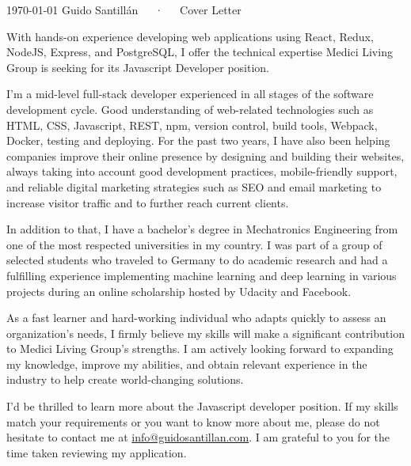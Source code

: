 \documentclass[11pt, a4paper]{awesome-cv}
\begin{document}
\makecvheader[C]

\makecvfooter
  {\today}
  {Guido Santillán~~~·~~~Cover Letter}
  {}

\makelettertitle

\begin{cvletter}

With hands-on experience developing web applications using React, Redux, NodeJS, Express, and PostgreSQL, I offer the technical expertise Medici Living Group is seeking for its Javascript Developer position.

I'm a mid-level full-stack developer experienced in all stages of the software development cycle. Good understanding of web-related technologies such as HTML, CSS, Javascript, REST, npm, version control, build tools, Webpack, Docker, testing and deploying. For the past two years, I have also been helping companies improve their online presence by designing and building their websites, always taking into account good development practices, mobile-friendly support, and reliable digital marketing strategies such as SEO and email marketing to increase visitor traffic and to further reach current clients.

In addition to that, I have a bachelor's degree in Mechatronics Engineering from one of the most respected universities in my country. I was part of a group of selected students who traveled to Germany to do academic research and had a fulfilling experience implementing machine learning and deep learning in various projects during an online scholarship hosted by Udacity and Facebook.

As a fast learner and hard-working individual who adapts quickly to assess an organization's needs, I firmly believe my skills will make a significant contribution to Medici Living Group's strengths. I am actively looking forward to expanding my knowledge, improve my abilities, and obtain relevant experience in the industry to help create world-changing solutions.

I'd be thrilled to learn more about the Javascript developer position. If my skills match your requirements or you want to know more about me, please do not hesitate to contact me at \href{mailto:info@guidosantillan.com}{info@guidosantillan.com}. I am grateful to you for the time taken reviewing my application.

\end{cvletter}
\end{document}

